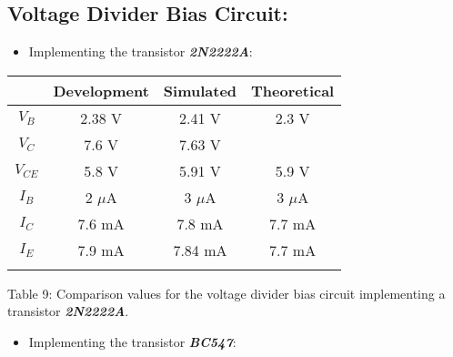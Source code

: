 \subsection{Voltage Divider Bias Circuit:}

\hfill \hfill
{\bfseries
\begin{itemize}
\item Implementing the transistor {\bfseries\itshape 2N2222A}:
\end{itemize}} \hfill

\begin{center}
\begin{tabular}[1.5cm]{c c c c}
\toprule
\toprule
\centering \hspace{75pt} & \hspace{30pt} Development \hspace{30pt} & \hspace{30pt} Simulated \hspace{30pt} & \hspace{30pt} Theoretical \hspace{30pt} \\
\midrule
\midrule
$V_{B}$ & 2.38 V & 2.41 V & 2.3 V\\
\cmidrule{1-4}
$V_{C}$ & 7.6 V & 7.63 V & \\
\cmidrule{1-4}
$V_{CE}$ & 5.8 V & 5.91 V & 5.9 V \\
\cmidrule{1-4}
$I_{B}$ & 2 $\mu$A & 3 $\mu$A & 3 $\mu$A \\
\cmidrule{1-4}
$I_{C}$ & 7.6 mA & 7.8 mA & 7.7 mA \\
\cmidrule{1-4}
$I_{E}$ & 7.9 mA & 7.84 mA & 7.7 mA \\
\bottomrule
\linebreak
\end{tabular}
\linebreak Table 9: Comparison values for the voltage divider bias circuit implementing a transistor {\bfseries\itshape 2N2222A}.
\end{center} \hfill

{\bfseries
\begin{itemize}
\item Implementing the transistor {\bfseries\itshape BC547}: 
\end{itemize}} \hfill

